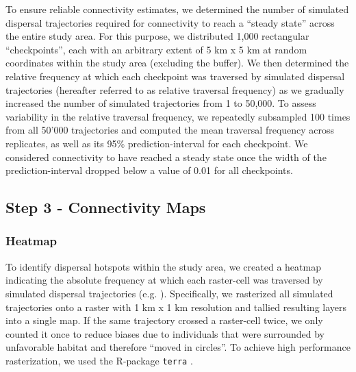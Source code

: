 \documentclass[abstract=on,10pt,a4paper,bibliography=totocnumbered]{article}
\begin{document}
To ensure reliable connectivity estimates, we determined the number of simulated
dispersal trajectories required for connectivity to reach a ``steady state''
across the entire study area. For this purpose, we distributed 1,000 rectangular
``checkpoints'', each with an arbitrary extent of 5 km x 5 km at random
coordinates within the study area (excluding the buffer). We then determined the
relative frequency at which each checkpoint was traversed by simulated dispersal
trajectories (hereafter referred to as relative traversal frequency) as we
gradually increased the number of simulated trajectories from 1 to 50,000. To
assess variability in the relative traversal frequency, we repeatedly subsampled
100 times from all 50'000 trajectories and computed the mean traversal frequency
across replicates, as well as its 95\% prediction-interval for each checkpoint.
We considered connectivity to have reached a steady state once the width of the
prediction-interval dropped below a value of 0.01 for all checkpoints.

\subsection{Step 3 - Connectivity Maps}
\subsubsection{Heatmap}
To identify dispersal hotspots within the study area, we created a heatmap
indicating the absolute frequency at which each raster-cell was traversed by
simulated dispersal trajectories (e.g. \citealp{Peer.2008, Hauenstein.2019,
Zeller.2020}). Specifically, we rasterized all simulated trajectories onto a
raster with 1 km x 1 km resolution and tallied resulting layers into a single
map. If the same trajectory crossed a raster-cell twice, we only counted it once
to reduce biases due to individuals that were surrounded by unfavorable habitat
and therefore ``moved in circles''. To achieve high performance rasterization,
we used the R-package {\tt terra} \citep{Hijmans.2021b}.
\end{document}
